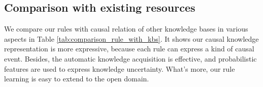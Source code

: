 \subsection{Comparison with existing resources}
We compare our rules with causal relation of other knowledge bases in various aspects in Table \ref{tab:comparison_rule_with_kbs}. It shows our causal knowledge representation is more expressive, because each rule can express a kind of causal event. Besides, the automatic knowledge acquisition is effective, and probabilistic features are used to express knowledge uncertainty. What's more, our rule learning is easy to extend to the open domain.


